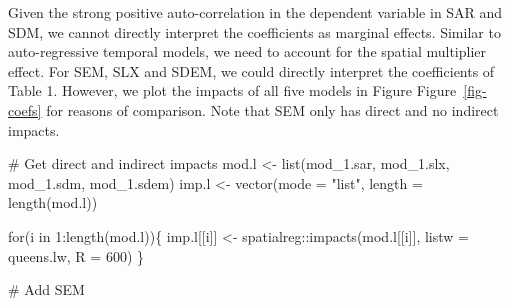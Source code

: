 \documentclass[
  letterpaper,
  DIV=11,
  numbers=noendperiod]{scrreprt}
\newenvironment{Shaded}{\begin{snugshade}}{\end{snugshade}}
\newcommand{\AttributeTok}[1]{\textcolor[rgb]{0.40,0.45,0.13}{#1}}
\newcommand{\CommentTok}[1]{\textcolor[rgb]{0.37,0.37,0.37}{#1}}
\newcommand{\ControlFlowTok}[1]{\textcolor[rgb]{0.00,0.23,0.31}{#1}}
\newcommand{\DecValTok}[1]{\textcolor[rgb]{0.68,0.00,0.00}{#1}}
\newcommand{\FunctionTok}[1]{\textcolor[rgb]{0.28,0.35,0.67}{#1}}
\newcommand{\NormalTok}[1]{\textcolor[rgb]{0.00,0.23,0.31}{#1}}
\newcommand{\OtherTok}[1]{\textcolor[rgb]{0.00,0.23,0.31}{#1}}
\newcommand{\SpecialCharTok}[1]{\textcolor[rgb]{0.37,0.37,0.37}{#1}}
\newcommand{\StringTok}[1]{\textcolor[rgb]{0.13,0.47,0.30}{#1}}
\begin{document}
Given the strong positive auto-correlation in the dependent variable in
SAR and SDM, we cannot directly interpret the coefficients as marginal
effects. Similar to auto-regressive temporal models, we need to account
for the spatial multiplier effect. For SEM, SLX and SDEM, we could
directly interpret the coefficients of Table 1. However, we plot the
impacts of all five models in Figure Figure~\ref{fig-coefs} for reasons
of comparison. Note that SEM only has direct and no indirect impacts.

\begin{Shaded}
\begin{Highlighting}[]
\CommentTok{\# Get direct and indirect impacts}
\NormalTok{mod.l }\OtherTok{\textless{}{-}} \FunctionTok{list}\NormalTok{(mod\_1.sar, mod\_1.slx, mod\_1.sdm, mod\_1.sdem)}
\NormalTok{imp.l }\OtherTok{\textless{}{-}} \FunctionTok{vector}\NormalTok{(}\AttributeTok{mode =} \StringTok{"list"}\NormalTok{, }\AttributeTok{length =} \FunctionTok{length}\NormalTok{(mod.l))}

\ControlFlowTok{for}\NormalTok{(i }\ControlFlowTok{in} \DecValTok{1}\SpecialCharTok{:}\FunctionTok{length}\NormalTok{(mod.l))\{}
\NormalTok{  imp.l[[i]] }\OtherTok{\textless{}{-}}\NormalTok{ spatialreg}\SpecialCharTok{::}\FunctionTok{impacts}\NormalTok{(mod.l[[i]], }\AttributeTok{listw =}\NormalTok{ queens.lw, }\AttributeTok{R =} \DecValTok{600}\NormalTok{)}
\NormalTok{\}}

\CommentTok{\# Add SEM}



\end{Highlighting}
\end{Shaded}
\end{document}
